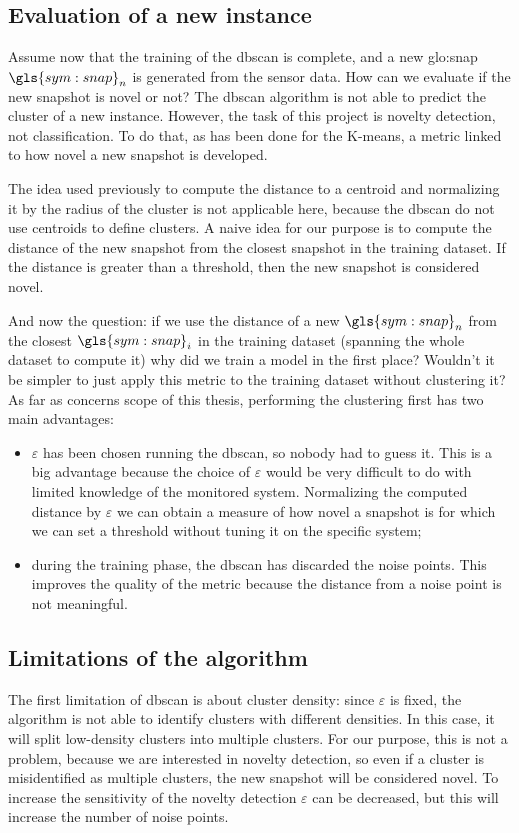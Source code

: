 \subsection{Evaluation of a new instance}
\label{sec:dbscan_eval}
Assume now that the training of the \gls{dbscan} is complete, and a new \gls{glo:snap} $\gls{sym:snap}_n$ is generated from the sensor data. How can we evaluate if the new snapshot is novel or not?
The \gls{dbscan} algorithm is not able to predict the cluster of a new instance. However, the task of this project is novelty detection, not classification.
To do that, as has been done for the K-means, a metric linked to how novel a new snapshot is developed. 

The idea used previously to compute the distance to a centroid and normalizing it by the radius of the cluster is not applicable here, because the \gls{dbscan} do not use centroids to define clusters. A naive idea for our purpose is to compute the distance of the new snapshot from the closest snapshot in the training dataset.
If the distance is greater than a threshold, then the new snapshot is considered novel.

And now the question: if we use the distance of a new $\gls{sym:snap}_n$ from the closest $\gls{sym:snap}_i$ in the training dataset (spanning the whole dataset to compute it) why did we train a model in the first place? Wouldn't it be simpler to just apply this metric to the training dataset without clustering it? As far as concerns scope of this thesis, performing the clustering first has two main advantages:
\begin{itemize}
    \item $\varepsilon$ has been chosen running the \gls{dbscan}, so nobody had to guess it. This is a big advantage because the choice of $\varepsilon$ would be very difficult to do with limited knowledge of the monitored system. Normalizing the computed distance by $\varepsilon$ we can obtain a measure of how novel a snapshot is for which we can set a threshold without tuning it on the specific system;
    \item during the training phase, the \gls{dbscan} has discarded the noise points. This improves the quality of the metric because the distance from a noise point is not meaningful.
\end{itemize}

\subsection{Limitations of the algorithm}
The first limitation of \gls{dbscan} is about cluster density: since $\varepsilon$ is fixed, the algorithm is not able to identify clusters with different densities. In this case, it will split low-density clusters into multiple clusters. For our purpose, this is not a problem, because we are interested in novelty detection, so even if a cluster is misidentified as multiple clusters, the new snapshot will be considered novel. To increase the sensitivity of the novelty detection $\varepsilon$ can be decreased, but this will increase the number of noise points.


